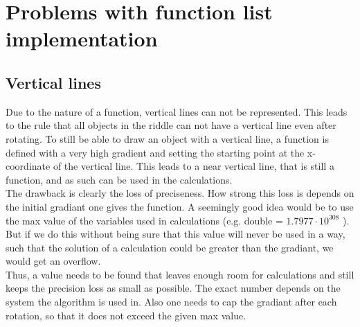\section{Problems with function list implementation}
\subsection{Vertical lines}
Due to the nature of a function, vertical lines can not be represented. This leads to the rule that all objects in the riddle can not have a vertical line even after rotating. 
To still be able to draw an object with a vertical line, a function is defined with a very high gradient and setting the starting point at the x-coordinate of the vertical line. This leads to a near vertical line, that is still a function, and as such can be used in the calculations.\\
The drawback is clearly the loss of preciseness. How strong this loss is depends on the initial gradiant one gives the function. A seemingly good idea would be to use the max value of the variables used in calculations (e.g. double = $1.7977 \cdot 10^{308}$ ). But if we do this without being sure that this value will never be used in a way, such that the solution of a calculation could be greater than the gradiant, we would get an overflow.\\
Thus, a value needs to be found that leaves enough room for calculations and still keeps the precision loss as small as possible. The exact number depends on the system the algorithm is used in. Also one needs to cap the gradiant after each rotation, so that it does not exceed the given max value.


